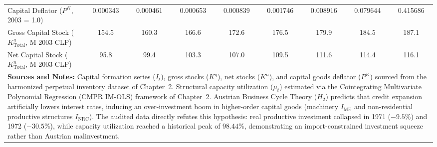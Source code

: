 \begin{table}[htbp]
{\begin{tabular}{lcccccccc}
Capital Deflator ($P^K$, 2003 = 1.0) & 0.000343 & 0.000461 & 0.000653 & 0.000839 & 0.001746 & 0.008916 & 0.079644 & 0.415686 \\
Gross Capital Stock ($K^g_{\text{Total}}$, M 2003 CLP) & 154.5 & 160.3 & 166.6 & 172.6 & 176.5 & 179.9 & 184.5 & 187.1 \\
Net Capital Stock ($K^n_{\text{Total}}$, M 2003 CLP) & 95.8 & 99.4 & 103.3 & 107.0 & 109.5 & 111.6 & 114.4 & 116.1 \\
\bottomrule
\multicolumn{9}{p{17.2cm}}{\footnotesize \textbf{Sources and Notes:} Capital formation series ($I_t$), gross stocks ($K^g$), net stocks ($K^n$), and capital goods deflator ($P^K$) sourced from the harmonized perpetual inventory dataset of Chapter~2. Structural capacity utilization ($\mu_t$) estimated via the Cointegrating Multivariate Polynomial Regression (CMPR IM-OLS) framework of Chapter~2. Austrian Business Cycle Theory ($H_2$) predicts that credit expansion artificially lowers interest rates, inducing an over-investment boom in higher-order capital goods (machinery $I_{\text{ME}}$ and non-residential productive structures $I_{\text{NRC}}$). The audited data directly refutes this hypothesis: real productive investment collapsed in 1971 ($-9.5\%$) and 1972 ($-30.5\%$), while capacity utilization reached a historical peak of $98.44\%$, demonstrating an import-constrained investment squeeze rather than Austrian malinvestment.}
\end{tabular}%
}
\end{table}
